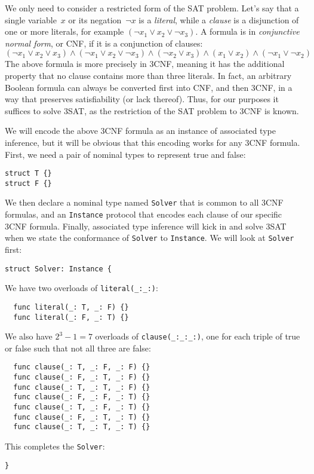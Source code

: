 \documentclass[../generics]{subfiles}
\begin{document}
We only need to consider a restricted form of the SAT problem. Let's say that a single variable~$x$ or its negation~$\neg x$ is a \emph{literal}, while a \emph{clause} is a disjunction of one or more literals, for example $(\neg x_1 \vee x_2 \vee \neg x_3)$. A formula is in \emph{conjunctive normal form}, or CNF, if it is a conjunction of clauses:
\[(\neg x_1 \vee x_2 \vee x_3) \wedge (\neg x_1 \vee x_2 \vee \neg x_3) \wedge (\neg x_2 \vee x_3) \wedge (x_1 \vee x_2) \wedge (\neg x_1 \vee \neg x_2)\]
The above formula is more precisely in 3CNF, meaning it has the additional property that no clause contains more than three literals. In fact, an arbitrary Boolean formula can always be converted first into CNF, and then 3CNF, in a way that preserves satisfiability (or lack thereof). Thus, for our purposes it suffices to solve 3SAT, as the restriction of the SAT problem to 3CNF is known.

We will encode the above 3CNF formula as an instance of associated type inference, but it will be obvious that this encoding works for any 3CNF formula. First, we need a pair of nominal types to represent true and false:
\begin{Verbatim}
struct T {}
struct F {}
\end{Verbatim}
We then declare a nominal type named \texttt{Solver} that is common to all 3CNF formulas, and an \texttt{Instance} protocol that encodes each clause of our specific 3CNF formula. Finally, associated type inference will kick in and solve 3SAT when we state the conformance of \texttt{Solver} to \texttt{Instance}. We will look at \texttt{Solver} first:
\begin{Verbatim}
struct Solver: Instance {
\end{Verbatim}
We have two overloads of \verb|literal(_:_:)|:
\begin{Verbatim}
  func literal(_: T, _: F) {}
  func literal(_: F, _: T) {}
\end{Verbatim}
We also have $2^3-1=7$ overloads of \verb|clause(_:_:_:)|, one for each triple of true or false such that not all three are false:
\begin{Verbatim}
  func clause(_: T, _: F, _: F) {}
  func clause(_: F, _: T, _: F) {}
  func clause(_: T, _: T, _: F) {}
  func clause(_: F, _: F, _: T) {}
  func clause(_: T, _: F, _: T) {}
  func clause(_: F, _: T, _: T) {}
  func clause(_: T, _: T, _: T) {}
\end{Verbatim}
This completes the \texttt{Solver}:
\begin{Verbatim}
}
\end{Verbatim}
\pagebreak
\end{document}
